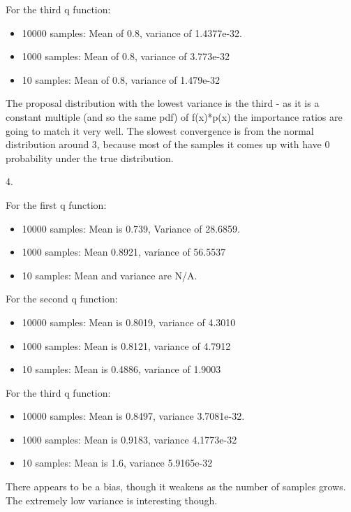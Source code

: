 \documentclass[12pt]{article}
\begin{document}
\begin{solution}
For the third q function:
\begin{itemize}
    \item 10000 samples: Mean of 0.8, variance of 1.4377e-32.
    \item 1000 samples: Mean of 0.8, variance of 3.773e-32
    \item 10 samples: Mean of 0.8, variance of 1.479e-32
\end{itemize}

The proposal distribution with the lowest variance is the third - as it is a constant multiple (and so the same pdf) of f(x)*p(x) the importance ratios are going to match it very well. The slowest convergence is from the normal distribution around 3, because most of the samples it comes up with have 0 probability under the true distribution.

4.

For the first q function:
\begin{itemize}
    \item 10000 samples: Mean is 0.739, Variance of 28.6859.
    \item 1000 samples: Mean 0.8921, variance of 56.5537
    \item 10 samples: Mean and variance are N/A.
\end{itemize}

For the second q function:
\begin{itemize}
    \item 10000 samples: Mean is 0.8019, variance of 4.3010
    \item 1000 samples: Mean is 0.8121, variance of 4.7912
    \item 10 samples: Mean is 0.4886, variance of 1.9003
\end{itemize}

For the third q function:
\begin{itemize}
    \item 10000 samples: Mean is 0.8497, variance 3.7081e-32.
    \item 1000 samples: Mean is 0.9183, variance 4.1773e-32
    \item 10 samples: Mean is 1.6, variance 5.9165e-32
\end{itemize}

There appears to be a bias, though it weakens as the number of samples grows. The extremely low variance is interesting though.
\end{solution}
\end{document}
